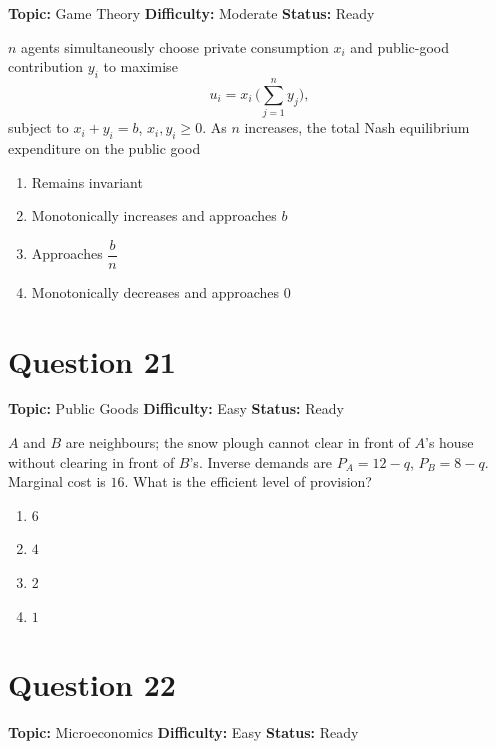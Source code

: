 \documentclass[11pt]{article}
\begin{document}

\noindent\textbf{Topic:} Game Theory \quad \textbf{Difficulty:} Moderate \quad \textbf{Status:} Ready



$n$ agents simultaneously choose private consumption $x_i$ and public-good
contribution $y_i$ to maximise
\[
u_i = x_i\, \Big(\sum_{j=1}^n y_j\Big),
\]
subject to $x_i + y_i = b$, $x_i, y_i \ge 0$. As $n$ increases, the total Nash
equilibrium expenditure on the public good
\begin{enumerate}[label=(\Alph*)]
\item Remains invariant
\item Monotonically increases and approaches $b$
\item Approaches $\dfrac{b}{n}$
\item Monotonically decreases and approaches $0$
\end{enumerate}

\newpage

\section*{Question 21}


\noindent\textbf{Topic:} Public Goods \quad \textbf{Difficulty:} Easy \quad \textbf{Status:} Ready



$A$ and $B$ are neighbours; the snow plough cannot clear in front of $A$'s house
without clearing in front of $B$'s. Inverse demands are $P_A = 12 - q$,
$P_B = 8 - q$. Marginal cost is $16$. What is the efficient level of provision?
\begin{enumerate}[label=(\Alph*)]
\item $6$ \item $4$ \item $2$ \item $1$
\end{enumerate}

\newpage

\section*{Question 22}


\noindent\textbf{Topic:} Microeconomics \quad \textbf{Difficulty:} Easy \quad \textbf{Status:} Ready
\end{document}
